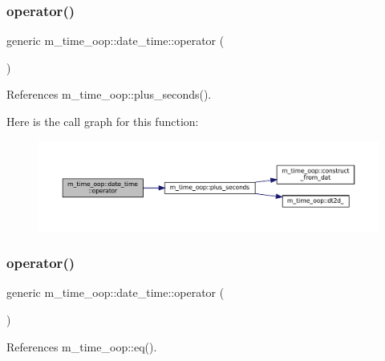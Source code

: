 \subsubsection{\texorpdfstring{operator()}{operator()}\hspace{0.1cm}{\footnotesize\ttfamily [1/9]}}
{\footnotesize\ttfamily generic m\+\_\+time\+\_\+oop\+::date\+\_\+time\+::operator (\begin{DoxyParamCaption}{ }\end{DoxyParamCaption})\hspace{0.3cm}{\ttfamily [private]}}



References m\+\_\+time\+\_\+oop\+::plus\+\_\+seconds().

Here is the call graph for this function\+:\nopagebreak
\begin{figure}[H]
\begin{center}
\leavevmode
\includegraphics[width=350pt]{structm__time__oop_1_1date__time_adee559f2f476e1167eb7846a582154ae_cgraph}
\end{center}
\end{figure}
\mbox{\label{structm__time__oop_1_1date__time_a33e80b5e54eec6e02c3a9dc0bc30e31a}} 
\subsubsection{\texorpdfstring{operator()}{operator()}\hspace{0.1cm}{\footnotesize\ttfamily [2/9]}}
{\footnotesize\ttfamily generic m\+\_\+time\+\_\+oop\+::date\+\_\+time\+::operator (\begin{DoxyParamCaption}{ }\end{DoxyParamCaption})\hspace{0.3cm}{\ttfamily [private]}}



References m\+\_\+time\+\_\+oop\+::eq().


